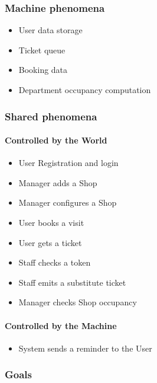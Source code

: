 \subsubsection{Machine phenomena}
\begin{itemize}
    \item User data storage
    \item Ticket queue
    \item Booking data
    \item Department occupancy computation
\end{itemize}

\subsubsection{Shared phenomena}

\paragraph{Controlled by the World}
\begin{itemize}
    \item User Registration and login
    \item Manager adds a Shop
    \item Manager configures a Shop
    \item User books a visit
    \item User gets a ticket
    \item Staff checks a token
    \item Staff emits a substitute ticket
    \item Manager checks Shop occupancy
\end{itemize}

\paragraph{Controlled by the Machine}
\begin{itemize}
    \item System sends a reminder to the User
\end{itemize}

\subsubsection{Goals}

